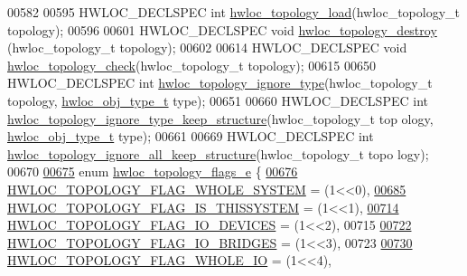 \begin{DoxyCode}
00582 
00595 HWLOC\_DECLSPEC \textcolor{keywordtype}{int} \hyperlink{a00043_ga91e2e6427b95fb7339c99dbbef996e71}{hwloc_topology_load}(hwloc\_topology\_t topology);
00596 
00601 HWLOC\_DECLSPEC \textcolor{keywordtype}{void} \hyperlink{a00043_ga6040925d3ee4bbb2647f2a321aca5f4b}{hwloc_topology_destroy} (hwloc\_topology\_t topology);
00602 
00614 HWLOC\_DECLSPEC \textcolor{keywordtype}{void} \hyperlink{a00043_gab3628b2a540a5a08e8cf724ef829e70a}{hwloc_topology_check}(hwloc\_topology\_t topology);
00615 
00650 HWLOC\_DECLSPEC \textcolor{keywordtype}{int} \hyperlink{a00044_gaf2071c8621fddc53649c245d87835b47}{hwloc_topology_ignore_type}(hwloc\_topology\_t topology, 
      \hyperlink{a00041_gacd37bb612667dc437d66bfb175a8dc55}{hwloc_obj_type_t} type);
00651 
00660 HWLOC\_DECLSPEC \textcolor{keywordtype}{int} \hyperlink{a00044_ga6ddd4213d95bd1c30555b294a60efa6b}{hwloc_topology_ignore_type_keep_structure}(hwloc\_topology\_t top
      ology, \hyperlink{a00041_gacd37bb612667dc437d66bfb175a8dc55}{hwloc_obj_type_t} type);
00661 
00669 HWLOC\_DECLSPEC \textcolor{keywordtype}{int} \hyperlink{a00044_gaec6fb00050f50cd41007f1ae580d2106}{hwloc_topology_ignore_all_keep_structure}(hwloc\_topology\_t topo
      logy);
00670 
\hypertarget{a00033_source_l00675}{}\hyperlink{a00044_gada025d3ec20b4b420f8038d23d6e7bde}{00675} \textcolor{keyword}{enum} \hyperlink{a00044_gada025d3ec20b4b420f8038d23d6e7bde}{hwloc_topology_flags_e} \{
\hypertarget{a00033_source_l00676}{}\hyperlink{a00044_ggada025d3ec20b4b420f8038d23d6e7bdea129b4fea1300be22bbaf0bb0958994c8}{00676}   \hyperlink{a00044_ggada025d3ec20b4b420f8038d23d6e7bdea129b4fea1300be22bbaf0bb0958994c8}{HWLOC_TOPOLOGY_FLAG_WHOLE_SYSTEM} = (1<<0),
\hypertarget{a00033_source_l00685}{}\hyperlink{a00044_ggada025d3ec20b4b420f8038d23d6e7bdea6ecb6abc6a0bb75e81564f8bca85783b}{00685}   \hyperlink{a00044_ggada025d3ec20b4b420f8038d23d6e7bdea6ecb6abc6a0bb75e81564f8bca85783b}{HWLOC_TOPOLOGY_FLAG_IS_THISSYSTEM} = (1<<1),
\hypertarget{a00033_source_l00714}{}\hyperlink{a00044_ggada025d3ec20b4b420f8038d23d6e7bdea46ae25e8896278840b1800ae9ce4de41}{00714}   \hyperlink{a00044_ggada025d3ec20b4b420f8038d23d6e7bdea46ae25e8896278840b1800ae9ce4de41}{HWLOC_TOPOLOGY_FLAG_IO_DEVICES} = (1<<2),
00715 
\hypertarget{a00033_source_l00722}{}\hyperlink{a00044_ggada025d3ec20b4b420f8038d23d6e7bdea426b18c349f15d7046bb391d96fa947c}{00722}   \hyperlink{a00044_ggada025d3ec20b4b420f8038d23d6e7bdea426b18c349f15d7046bb391d96fa947c}{HWLOC_TOPOLOGY_FLAG_IO_BRIDGES} = (1<<3),
00723 
\hypertarget{a00033_source_l00730}{}\hyperlink{a00044_ggada025d3ec20b4b420f8038d23d6e7bdea4a41dc181649ef81c2dcd44a54e271b9}{00730}   \hyperlink{a00044_ggada025d3ec20b4b420f8038d23d6e7bdea4a41dc181649ef81c2dcd44a54e271b9}{HWLOC_TOPOLOGY_FLAG_WHOLE_IO} = (1<<4),

\end{DoxyCode}
